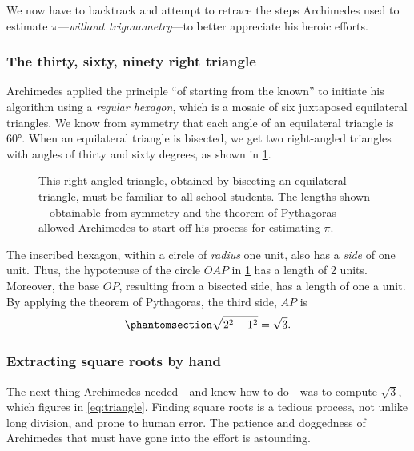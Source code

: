 \documentclass[
  a4paper,
]{article}
\begin{document}
We now have to backtrack and attempt to retrace the steps Archimedes
used to estimate \(\pi\)---\emph{without trigonometry}---to better
appreciate his heroic efforts.

\subsubsection{The thirty, sixty, ninety right
triangle}\label{the-thirty-sixty-ninety-right-triangle}

Archimedes applied the principle ``of starting from the known'' to
initiate his algorithm using a \emph{regular hexagon}, which is a mosaic
of six juxtaposed equilateral triangles. We know from symmetry that each
angle of an equilateral triangle is \(60°\). When an equilateral
triangle is bisected, we get two right-angled triangles with angles of
thirty and sixty degrees, as shown in \cref{fig:thirty-sixty}.

\begin{figure}
\centering

\caption{This right-angled triangle, obtained by bisecting an
equilateral triangle, must be familiar to all school students. The
lengths shown---obtainable from symmetry and the theorem of
Pythagoras---allowed Archimedes to start off his process for estimating
\(\pi\).}\label{fig:thirty-sixty}
\end{figure}

The inscribed hexagon, within a circle of \emph{radius} one unit, also
has a \emph{side} of one unit. Thus, the hypotenuse of the circle
\(OAP\) in \cref{fig:thirty-sixty} has a length of 2 units. Moreover,
the base \(OP\), resulting from a bisected side, has a length of one a
unit. By applying the theorem of Pythagoras, the third side, \(AP\) is
\begin{equation}\phantomsection\label{eq:triangle}{
\sqrt{2^2 - 1^2} = \sqrt{3}.
}\end{equation}

\subsubsection{Extracting square roots by
hand}\label{extracting-square-roots-by-hand}

The next thing Archimedes needed---and knew how to do---was to compute
\(\sqrt{3}\), which figures in \cref{eq:triangle}. Finding square roots
is a tedious process, not unlike long division, and prone to human
error. The patience and doggedness of Archimedes that must have gone
into the effort is astounding.
\end{document}
